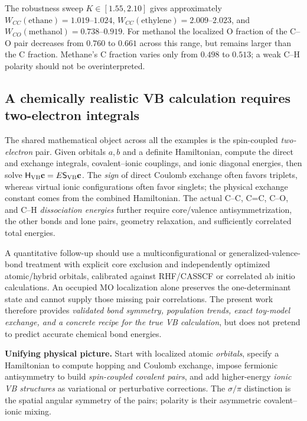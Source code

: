 \documentclass[11pt,letterpaper]{article}
\newcommand{\highlight}[1]{\par\smallskip\noindent\colorbox{pale}{\parbox{0.956\linewidth}{\strut #1\strut}}\smallskip\par}
\begin{document}
The robustness sweep $K\in[1.55,2.10]$ gives approximately $W_{CC}(\mathrm{ethane})=1.019$--$1.024$, $W_{CC}(\mathrm{ethylene})=2.009$--$2.023$, and $W_{CO}(\mathrm{methanol})=0.738$--$0.919$. For methanol the localized O fraction of the C--O pair decreases from $0.760$ to $0.661$ across this range, but remains larger than the C fraction. Methane's C fraction varies only from $0.498$ to $0.513$; a weak C--H polarity should not be overinterpreted.

\subsection{A chemically realistic VB calculation requires two-electron integrals}
The shared mathematical object across all the examples is the spin-coupled \emph{two-electron} pair. Given orbitals $a,b$ and a definite Hamiltonian, compute the direct and exchange integrals, covalent--ionic couplings, and ionic diagonal energies, then solve $\mathsf H_{\rm VB}\mathbf c=E\mathsf S_{\rm VB}\mathbf c$. The \emph{sign} of direct Coulomb exchange often favors triplets, whereas virtual ionic configurations often favor singlets; the physical exchange constant comes from the combined Hamiltonian. The actual C--C, C=C, C--O, and C--H \emph{dissociation energies} further require core/valence antisymmetrization, the other bonds and lone pairs, geometry relaxation, and sufficiently correlated total energies.

A quantitative follow-up should use a multiconfigurational or generalized-valence-bond treatment with explicit core exclusion and independently optimized atomic/hybrid orbitals, calibrated against RHF/CASSCF or correlated ab initio calculations. An occupied MO localization alone preserves the one-determinant state and cannot supply those missing pair correlations. The present work therefore provides \emph{validated bond symmetry, population trends, exact toy-model exchange, and a concrete recipe for the true VB calculation}, but does not pretend to predict accurate chemical bond energies.

\highlight{\textbf{Unifying physical picture.} Start with localized atomic \emph{orbitals}, specify a Hamiltonian to compute hopping and Coulomb exchange, impose fermionic antisymmetry to build \emph{spin-coupled covalent pairs}, and add higher-energy \emph{ionic VB structures} as variational or perturbative corrections. The $\sigma/\pi$ distinction is the spatial angular symmetry of the pairs; polarity is their asymmetric covalent--ionic mixing.}
\end{document}

